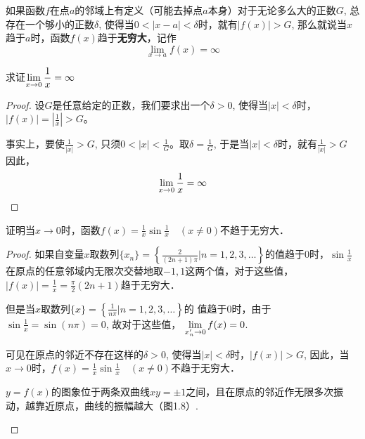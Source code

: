 如果函数$f$在点$a$的邻域上有定义（可能去掉点$a$本身）对于无论多么大的正数$G$, 总存在一个够小的正数$\delta$, 使得当$0<|x-a|<\delta$时，就有$|f(x)|>G$, 那么就说当$x$趋于$a$时，函数$f(x)$趋于\textbf{无穷大}，记作
\[\lim_{x\to a} f (x) =\infty\]

\begin{example}
    求证$\displaystyle\lim_{x\to 0}\dfrac{1}{x}=\infty$
\end{example}
   
\begin{proof}
设$G$是任意给定的正数，我们要求出一个$\delta>0$, 使得当$|x|<\delta$时，$|f(x)|=\left|\frac{1}{x}\right|>G$。

事实上，要使$\frac{1}{|x|}>G$, 
只须$0<|x|<\frac{1}{G} $。取$\delta=\frac{1}{G}$, 于是当$|x|<\delta$时，就有$\frac{1}{|x|}>G$
因此，
$$\displaystyle\lim_{x\to 0}\dfrac{1}{x}=\infty$$
\end{proof}

\begin{example}
    证明当$x\to 0$时，函数$f(x)=\frac{1}{x}\sin\frac{1}{x}\quad (x\ne 0)$不趋于无穷大．
\end{example}

\begin{proof}
如果自变量$x$取数列$\{x_n\}=\left\{\frac{2}{(2n+1)\pi}\Big|n=1, 2, 3,\ldots\right\}$的值趋于0时，$\sin\frac{1}{x}$在原点的任意邻域内无限次交替地取$-1, 1$这两个值，对于这些值，$|f(x)|=\frac{1}{x}=\frac{\pi}{2}(2n+1)$趋于无穷大．

但是当$x$取数列$\{x\}=\left\{\frac{1}{n\pi}\Big| n=1, 2, 3,\ldots\right\}$的
值趋于0时，由于
$\sin\frac{1}{x}=\sin (n\pi) =0$, 
故对于这些值，
$\displaystyle\lim_{x'_n\to 0} f (x) =0$.

可见在原点的邻近不存在这样的$\delta>0$, 使得当$|x|<\delta$时，$|f(x)|>G$, 因此，当$x\to 0$时，$f(x)=\frac{1}{x}\sin\frac{1}{x}\quad (x\ne 0)$不趋于无穷大．

$y=f(x)$的图象位于两条双曲线$xy=\pm 1$之间，且在原点的邻近作无限多次振动，越靠近原点，曲线的振幅越大（图1.8）.

\begin{figure}[htp]
    \centering
{}
    \caption{}
\end{figure}

\end{proof}

